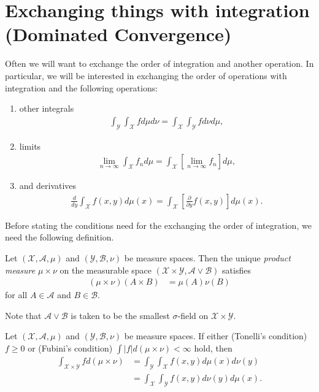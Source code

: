 \documentclass[twoside]{article}
\begin{document}
\section{Exchanging things with integration (Dominated Convergence)}

Often we will want to exchange the order of integration and another operation.
In particular, we will be interested in exchanging the order of operations with
integration and the following operations:
\begin{enumerate}
  \item other integrals
    \begin{align*}
      \int_{\mathcal Y} \int_{\mathcal X} f d\mu d\nu = \int_{\mathcal X} \int_{\mathcal Y} f d\nu d\mu,
    \end{align*}
  \item limits
    \begin{align*}
      \lim_{n \rightarrow \infty} \int_{\mathcal X} f_n d\mu = \int_{\mathcal X} \left[
    \lim_{n \rightarrow \infty} f_n \right] d\mu,
    \end{align*}
  \item and derivatives
    \begin{align*}
      \frac{d}{dy} \int_{\mathcal X} f(x, y) d\mu(x) = \int_{\mathcal X}
    \left[\frac{\partial}{\partial y} f(x, y)\right] d\mu(x).
    \end{align*}
\end{enumerate}

Before stating the conditions need for the exchanging the order of integration,
we need the following definition.
\begin{definition} Let $(\mathcal X, \mathcal A, \mu)$ and $(\mathcal Y, \mathcal B, \nu)$
  be measure spaces.  Then the unique \emph{product measure} $\mu \times \nu$ on
  the measurable space $(\mathcal X \times \mathcal Y, \mathcal A \vee \mathcal B)$ satisfies
  \begin{align*}
    (\mu \times \nu)(A\times B) &= \mu(A)\nu(B)
  \end{align*}
  for all $A \in  \mathcal A$ and $B \in \mathcal B$.
\end{definition}
Note that $\mathcal A \vee \mathcal B$ is taken to be the smallest $\sigma$-field on
$\mathcal X \times \mathcal Y$.
\begin{theorem}\citep[Theorem 1.7, p.~13]{keener}
  Let $(\mathcal X, \mathcal A, \mu)$ and $(\mathcal Y, \mathcal B, \nu)$
  be measure spaces.  If either (Tonelli's condition) $f \geq 0$ or (Fubini's
  condition) $\int |f| d(\mu \times \nu) < \infty$  hold, then
  \begin{align*}
    \int_{\mathcal X \times \mathcal Y} f d(\mu \times \nu) &= \int_{\mathcal Y} \int_{\mathcal X} f(x, y) d\mu(x) d\nu(y) \\
    &= \int_{\mathcal X} \int_{\mathcal Y} f(x, y) d\nu(y) d\mu(x).
  \end{align*}
\end{theorem}
\end{document}
